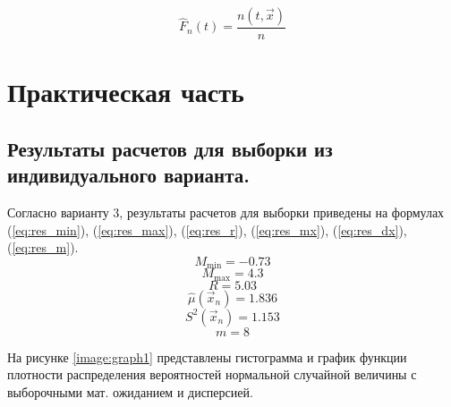 \begin{equation}
	\hat F_n(t) = \frac{n(t, \vec x)}{n}
\end{equation}

\chapter{Практическая часть}

\section{Результаты расчетов для выборки из индивидуального варианта.}
Согласно варианту 3, результаты расчетов для выборки приведены на формулах (\ref{eq:res_min}), (\ref{eq:res_max}), (\ref{eq:res_r}), (\ref{eq:res_mx}), (\ref{eq:res_dx}), (\ref{eq:res_m}).
\begin{equation}
	\label{eq:res_min}
	M_{\min} = -0.73
\end{equation}
\begin{equation}
	\label{eq:res_max}
	M_{\max} = 4.3
\end{equation}
\begin{equation}
	\label{eq:res_r}
	R = 5.03
\end{equation}
\begin{equation}
	\label{eq:res_mx}
	\hat\mu(\vec x_n) = 1.836
\end{equation}
\begin{equation}
	\label{eq:res_dx}
	S^2(\vec x_n) = 1.153
\end{equation}
\begin{equation}
	\label{eq:res_m}
	m = 8
\end{equation}

\clearpage

На рисунке \ref{image:graph1} представлены гистограмма и график функции плотности распределения вероятностей нормальной случайной величины с выборочными мат. ожиданием и дисперсией.
\begin{figure}[h]
\end{figure}

